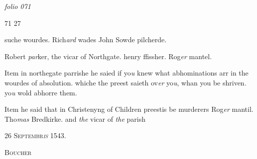 \documentclass[12pt, a4paper]{book}
\begin{document}
\dotfill
					

\textit{folio 071}


\begin{flushright}{\color{Mahogany}71} 27\end{flushright}
	
		\ifthenelse{\isodd{\thepage}}
		{\reversemarginpar}
		{\normalmarginpar}
		suche wourdes. Rich\textit{ard }wades John Sowde  pilcherde.
			
		Robert \textit{par}ker, the vicar of Northgate. henry ffissher. Rog\textit{er}
	 mantel.
 
 	
				\marginpar[\vspace{0.5cm}{\textcolor{Gray}{Confession}}]{}
			
 	
		\ifthenelse{\isodd{\thepage}}
		{\reversemarginpar}
		{\normalmarginpar}
		Item in northegate parrishe he saied if yo\textit{u} knew
 what abhominations arr in the wourdes of
 absolution. whiche the preest saieth ov\textit{er} yo\textit{u}, whan
 you be shriven. yo\textit{u} wold abhorre them.
 

	
				\marginpar[\vspace{0.5cm}{\textcolor{Gray}{offensive}}]{}
			
	
		\ifthenelse{\isodd{\thepage}}
		{\reversemarginpar}
		{\normalmarginpar}
		Item he said that in Christenyng of Children
		preestis be murderers Rog\textit{er} mantil. Tho\textit{mas} Bredkirke.
		and \textit{the} vicar of \textit{the} parish
 

            
            
               
				\begin{center} \begin{large} {\scshape 
                  26 Septembr\textit{is} 1543.} \end{large} \end{center}
			
               
               	
				\begin{center}  {\scshape Boucher}  \end{center}
			
               	
               		
				\marginpar[\vspace{0.5cm}{\textcolor{Gray}{Offensive n}}]{}
			
\end{document}
